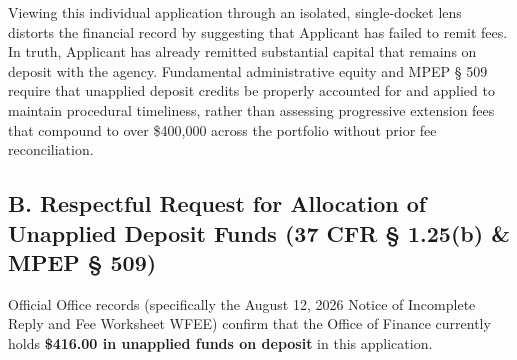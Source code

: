 \documentclass[11pt,letterpaper]{article}
\begin{document}
Viewing this individual application through an isolated, single-docket lens distorts the financial record by suggesting that Applicant has failed to remit fees. In truth, Applicant has already remitted substantial capital that remains on deposit with the agency. Fundamental administrative equity and MPEP \S{} 509 require that unapplied deposit credits be properly accounted for and applied to maintain procedural timeliness, rather than assessing progressive extension fees that compound to over \$400,000 across the portfolio without prior fee reconciliation.

\subsection*{B. Respectful Request for Allocation of Unapplied Deposit Funds (37 CFR \S{} 1.25(b) \& MPEP \S{} 509)}
Official Office records (specifically the August 12, 2026 Notice of Incomplete Reply and Fee Worksheet WFEE) confirm that the Office of Finance currently holds \textbf{\$416.00 in unapplied funds on deposit} in this application.
\end{document}
